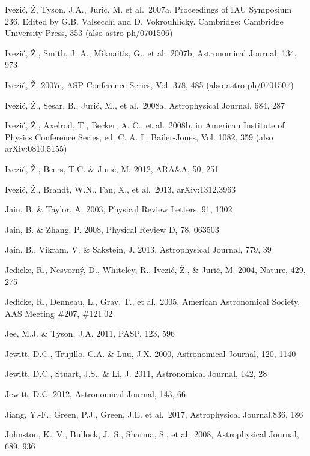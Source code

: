 \documentclass{emulateapj}
\begin{document}
\begin{thebibliography}{}
\bibitem[()]{} Ivezi\'{c}, \v{Z}, Tyson, J.A., Juri\'{c}, M. et al.~2007a, Proceedings of IAU Symposium
             236. Edited by G.B. Valsecchi and D. Vokrouhlick\'{y}. Cambridge: Cambridge University
             Press, 353 (also astro-ph/0701506)

\bibitem[()]{} Ivezi\'{c}, \v{Z}., Smith, J. A., Miknaitis, G., et al.~2007b, Astronomical Journal, 134, 973

\bibitem[()]{} Ivezi\'{c}, \v{Z}. 2007c, ASP Conference Series, Vol. 378, 485 (also astro-ph/0701507)

\bibitem[()]{} Ivezi\'c, \v Z., Sesar, B., Juri\'{c}, M., et al.~2008a, Astrophysical Journal, 684, 287

\bibitem[()]{} Ivezi\'c, \v Z., Axelrod, T., Becker, A. C., et al.~2008b, in American Institute of
                           Physics Conference Series, ed. C. A. L. Bailer-Jones, Vol. 1082, 359 (also arXiv:0810.5155)

\bibitem[()]{} Ivezi\'c, \v Z., Beers, T.C. \& Juri\'{c}, M. 2012, ARA\&A, 50, 251

\bibitem[()]{} Ivezi\'c, \v Z., Brandt, W.N., Fan, X., et al.~2013, arXiv:1312.3963

\bibitem[()]{} Jain, B. \& Taylor, A. 2003, Physical Review Letters, 91, 1302

\bibitem[()]{} Jain, B. \& Zhang, P. 2008, Physical Review D, 78, 063503

\bibitem[()]{} Jain, B., Vikram, V. \& Sakstein, J. 2013, Astrophysical Journal, 779, 39

\bibitem[()]{} Jedicke, R., Nesvorn{\'y}, D., Whiteley, R., Ivezi{\'c}, {\v Z}., \& Juri{\'c}, M. 2004,
             Nature, 429, 275

\bibitem[()]{} Jedicke, R., Denneau, L., Grav, T., et al.~2005, American Astronomical Society, AAS
             Meeting \#207, \#121.02

\bibitem[()]{} Jee, M.J. \& Tyson, J.A. 2011, PASP, 123, 596

\bibitem[()]{} Jewitt, D.C., Trujillo, C.A. \& Luu, J.X. 2000, Astronomical Journal, 120, 1140

\bibitem[()]{} Jewitt, D.C., Stuart, J.S., \& Li, J. 2011, Astronomical Journal, 142, 28

\bibitem[()]{} Jewitt, D.C. 2012, Astronomical Journal, 143, 66

\bibitem[()]{} Jiang, Y.-F., Green, P.J., Green, J.E. et al.~2017, Astrophysical Journal,836, 186

\bibitem[()]{} Johnston, K.~V., Bullock, J.~S., Sharma, S., et al.~2008, Astrophysical Journal, 689, 936


\end{thebibliography}
\end{document}
